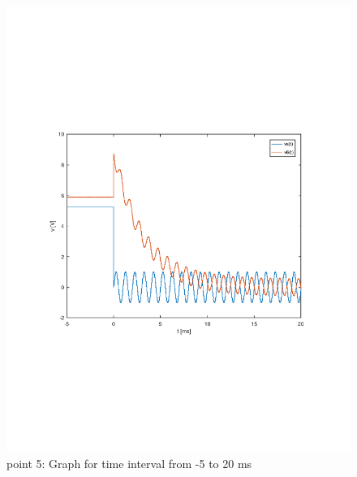 \begin{figure}[h] \centering
\includegraphics[width=0.9\linewidth]{theo5_tab.pdf}
\caption{point 5: Graph for time interval from -5 to 20 ms}
\label{fig:theo5}
\end{figure}

